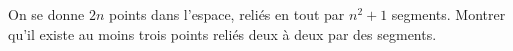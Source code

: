 On se donne $2n$ points dans l'espace, reliés en tout par $n^2 + 1$ segments. Montrer qu'il existe au moins trois points reliés deux à deux par des segments.
